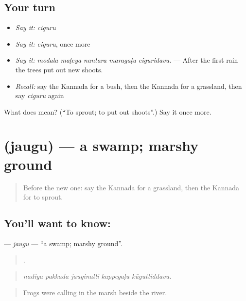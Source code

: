 \subsection*{Your turn}
\begin{itemize}
\raggedright
  \item \emph{Say it:} \emph{ciguru}
  \item \emph{Say it:} \emph{ciguru}, once more
  \item \emph{Say it:} \emph{modala maḷeya nantara maragaḷu ciguridavu.} — After the first rain the trees put out new shoots.
  \item \emph{Recall:} say the Kannada for a bush, then the Kannada for a grassland, then say \emph{ciguru} again
\end{itemize}

\begin{tcolorbox}[breakable,colback=teal!4,colframe=teal!35!black,title={Before you move on}]
What does  mean? (\textquotedblleft{}To sprout; to put out shoots\textquotedblright{}.) Say it once more.
\end{tcolorbox}
\section[\texorpdfstring{\kn{ಜೌಗು} (jaugu)}{ಜೌಗು (jaugu)}]{ (jaugu) — a swamp; marshy ground}

\label{lesson:KA-C479-jaugu}



\begin{quote}
Before the new one: say the Kannada for a grassland, then the Kannada for to sprout.
\end{quote}

\subsection*{You'll want to know: }
\textbf{} — \emph{jaugu} — \textquotedblleft{}a swamp; marshy ground\textquotedblright{}.

\begin{quote}
    .
\end{quote}

\begin{quote}
\emph{nadiya pakkada jauginalli kappegaḷu kūguttiddavu.}
\end{quote}

\begin{quote}
Frogs were calling in the marsh beside the river.
\end{quote}

